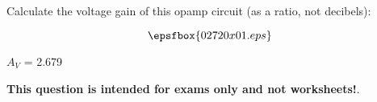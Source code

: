 

Calculate the voltage gain of this opamp circuit (as a ratio, not decibels):

$$\epsfbox{02720x01.eps}$$







$A_V$ = 2.679







{\bf This question is intended for exams only and not worksheets!}.




